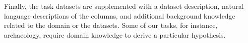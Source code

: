 Finally, the task datasets are supplemented with a dataset description, natural language descriptions of the columns, and additional background knowledge related to the domain or the datasets. Some of our tasks, for instance, archaeology, require domain knowledge to derive a particular hypothesis.







